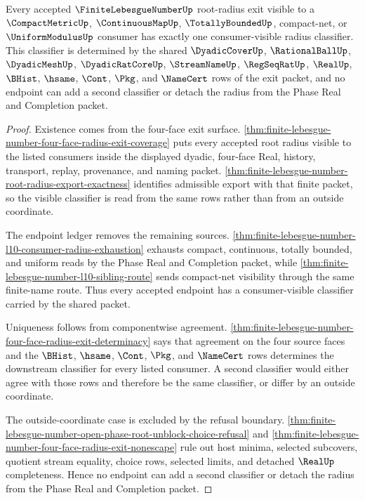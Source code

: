 \begin{theorem}
\label{thm:finite-lebesgue-number-open-phase-root-radius-classifier-totality}
Every accepted $\FiniteLebesgueNumberUp$ root-radius exit visible to a $\CompactMetricUp$, $\ContinuousMapUp$, $\TotallyBoundedUp$, compact-net, or $\UniformModulusUp$ consumer has exactly one consumer-visible radius classifier. This classifier is determined by the shared $\DyadicCoverUp$, $\RationalBallUp$, $\DyadicMeshUp$, $\DyadicRatCoreUp$, $\StreamNameUp$, $\RegSeqRatUp$, $\RealUp$, $\BHist$, $\hsame$, $\Cont$, $\Pkg$, and $\NameCert$ rows of the exit packet, and no endpoint can add a second classifier or detach the radius from the Phase Real and Completion packet.
\end{theorem}
\begin{proof}
Existence comes from the four-face exit surface. \autoref{thm:finite-lebesgue-number-four-face-radius-exit-coverage} puts every accepted root radius visible to the listed consumers inside the displayed dyadic, four-face Real, history, transport, replay, provenance, and naming packet. \autoref{thm:finite-lebesgue-number-root-radius-export-exactness} identifies admissible export with that finite packet, so the visible classifier is read from the same rows rather than from an outside coordinate.

The endpoint ledger removes the remaining sources. \autoref{thm:finite-lebesgue-number-l10-consumer-radius-exhaustion} exhausts compact, continuous, totally bounded, and uniform reads by the Phase Real and Completion packet, while \autoref{thm:finite-lebesgue-number-l10-sibling-route} sends compact-net visibility through the same finite-name route. Thus every accepted endpoint has a consumer-visible classifier carried by the shared packet.

Uniqueness follows from componentwise agreement. \autoref{thm:finite-lebesgue-number-four-face-radius-exit-determinacy} says that agreement on the four source faces and the $\BHist$, $\hsame$, $\Cont$, $\Pkg$, and $\NameCert$ rows determines the downstream classifier for every listed consumer. A second classifier would either agree with those rows and therefore be the same classifier, or differ by an outside coordinate.

The outside-coordinate case is excluded by the refusal boundary. \autoref{thm:finite-lebesgue-number-open-phase-root-unblock-choice-refusal} and \autoref{thm:finite-lebesgue-number-four-face-radius-exit-nonescape} rule out host minima, selected subcovers, quotient stream equality, choice rows, selected limits, and detached $\RealUp$ completeness. Hence no endpoint can add a second classifier or detach the radius from the Phase Real and Completion packet.
\end{proof}

